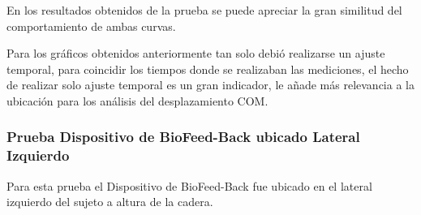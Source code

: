 \documentclass[12pt,a4paper]{article}
\newcommand{\nombreDispositivo}{Dispositivo de BioFeed-Back }
\begin{document}
	En los resultados obtenidos de la prueba se puede apreciar la gran similitud del comportamiento de ambas curvas.
	
	Para los gráficos obtenidos anteriormente tan solo debió realizarse un ajuste temporal, para coincidir los tiempos donde se realizaban las mediciones, el hecho de realizar solo ajuste temporal es un gran indicador, le añade más relevancia a la ubicación para los análisis del desplazamiento COM.



\newpage
\subsubsection{Prueba \nombreDispositivo ubicado Lateral Izquierdo}
	Para esta prueba el \nombreDispositivo fue ubicado en el lateral izquierdo del sujeto a altura de la cadera.
		
\end{document}
